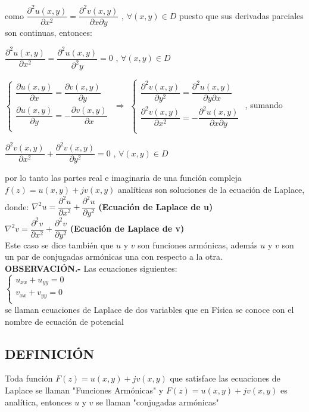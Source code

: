 \documentclass[10pt,a4paper]{book}
\begin{document}
 como $\dfrac{\partial^2 u(x,y)}{\partial x^2} = \dfrac{\partial^2 v(x,y)}{\partial x \partial y}$ , $\forall (x,y) \in D$ puesto que sus derivadas parciales son continuas, entonces:
 \begin{center}
  $\dfrac{\partial^2 u(x,y)}{\partial x^2} = \dfrac{\partial^2 u(x,y)}{\partial^2 y} = 0$ , $\forall (x,y) \in D$ 
 \end{center}
 $\displaystyle \left\{ 
  \begin{array}{lcr}
    \dfrac{\partial u(x,y)}{\partial x} = \dfrac{\partial v(x,y)}{\partial y} \\
    \dfrac{\partial u(x,y)} {\partial y} = -\dfrac{\partial v(x,y)}{\partial x}\\
   \end{array}   
\right.$ 
	$\Rightarrow$	 $\displaystyle \left\{ 
  \begin{array}{lcr}
    \dfrac{\partial^2 v(x,y)}{\partial y^2} = \dfrac{\partial^2 u(x,y)}{\partial y \partial x} \\
    \dfrac{\partial^2 v(x,y)}{\partial x^2} = -\dfrac{\partial^2 u(x,y)}{\partial x \partial y}\\
   \end{array}   
\right.$ , sumando \\
\begin{center}
 $\dfrac{\partial^2 v(x,y)}{\partial x^2} + \dfrac{\partial^2 v(x,y)}{\partial y^2} = 0 $ , $\forall (x,y) \in D$ \\
\end{center}  
 por lo tanto las partes real e imaginaria de una función compleja $f(z)=u(x,y) + jv(x,y)$ analíticas son soluciones de la ecuación de Laplace, donde:
 $\nabla^2 u = \dfrac{\partial^2 u}{\partial x^2} + \dfrac{\partial^2 u}{\partial y^2}$ \textbf{(Ecuación de Laplace de u)} \\
 $\nabla^2 v = \dfrac{\partial^2 v}{\partial x^2} + \dfrac{\partial^2 v}{\partial y^2}$ \textbf{(Ecuación de Laplace de v)} \\
Este caso se dice también que $u$ y $v$ son funciones armónicas, además $u$ y $v$ son un par de conjugadas armónicas una con respecto a la otra. \\
\textbf{OBSERVACIÓN.- } Las ecuaciones siguientes: \\
$\displaystyle \left\{ 
  \begin{array}{lcr}
    u_{xx} + u_{yy} = 0 \\
    v_{xx} + v_{yy} = 0 \\
   \end{array}   
\right.$ \\
se llaman ecuaciones de Laplace de dos variables que en Física se conoce con el nombre de ecuación de potencial\\
\subsection{DEFINICIÓN} Toda función $F(z)=u(x,y)+jv(x,y)$ que satisface las ecuaciones de Laplace se llaman "Funciones Armónicas" y $F(z)=u(x,y)+jv(x,y)$ es analítica, entonces $u$ y $v$ se llaman "conjugadas armónicas"
\end{document}

